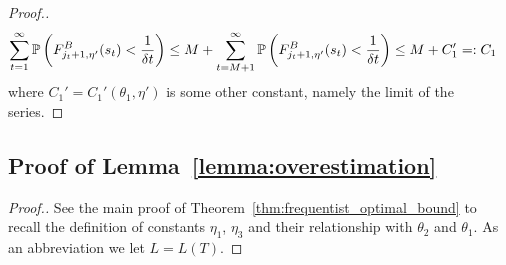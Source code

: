 \begin{proof}[Proof.]
	\begin{align*}
	\sum_{t=1}^\infty \P{F^B_{j_t+1, \eta'}(s_t) < \frac{1}{\delta t}} & \le M +  \sum_{t=M+1}^\infty \P{F^B_{j_t+1, \eta'}(s_t) < \frac{1}{\delta t}} \le M +  C_1' =: C_1
	\end{align*}
	where $C_1' = C_1'(\theta_1, \eta')$ is some other constant, namely the limit of the series.
\end{proof}

\subsection{Proof of Lemma~\ref{lemma:overestimation}} \label{proof:overestimation_proof}

\begin{proof}[Proof.]
	See the main proof of Theorem~\ref{thm:frequentist_optimal_bound} to recall the definition of constants $\eta_1$, $\eta_3$ and their relationship with $\theta_2$ and $\theta_1$. As an abbreviation we let $L = L(T)$. 
	

\end{proof}
